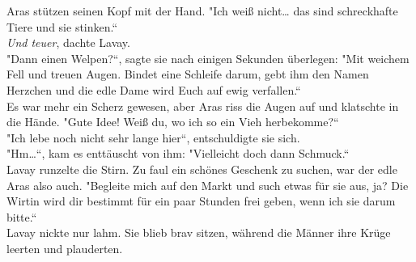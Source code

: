 Aras stützen seinen Kopf mit der Hand. "Ich weiß nicht… das sind schreckhafte Tiere und sie 
stinken.``\\
\textit{Und teuer}, dachte Lavay.\\
"Dann einen Welpen?``, sagte sie nach einigen Sekunden überlegen: "Mit weichem Fell und treuen 
Augen. Bindet eine Schleife darum, gebt ihm den Namen Herzchen und die edle Dame wird Euch auf ewig 
verfallen.``\\
Es war mehr ein Scherz gewesen, aber Aras riss die Augen auf und klatschte in die Hände. "Gute 
Idee! Weiß du, wo ich so ein Vieh herbekomme?``\\
"Ich lebe noch nicht sehr lange hier``, entschuldigte sie sich.\\
"Hm…``, kam es enttäuscht von ihm: "Vielleicht doch dann Schmuck.``\\
Lavay runzelte die Stirn. Zu faul ein schönes Geschenk zu suchen, war der edle Aras also auch. 
"Begleite mich auf den Markt und such etwas für sie aus, ja? Die Wirtin wird dir bestimmt für ein 
paar Stunden frei geben, wenn ich sie darum bitte.``\\
Lavay nickte nur lahm. Sie blieb brav sitzen, während die Männer ihre Krüge leerten und 
plauderten.\\

